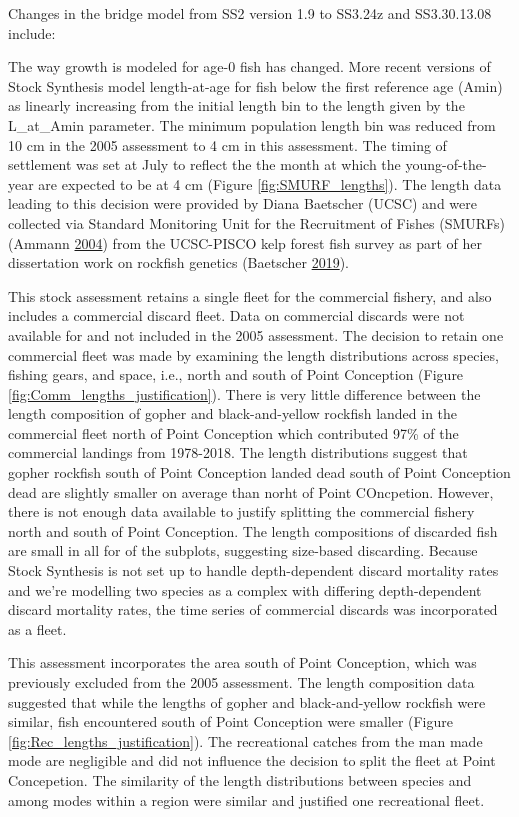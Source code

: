 \documentclass[12pt,]{article}
\begin{document}
Changes in the bridge model from SS2 version 1.9 to SS3.24z and
SS3.30.13.08 include:

The way growth is modeled for age-0 fish has changed. More recent
versions of Stock Synthesis model length-at-age for fish below the first
reference age (Amin) as linearly increasing from the initial length bin
to the length given by the L\_at\_Amin parameter. The minimum population
length bin was reduced from 10 cm in the 2005 assessment to 4 cm in this
assessment. The timing of settlement was set at July to reflect the the
month at which the young-of-the-year are expected to be at 4 cm (Figure
\ref{fig:SMURF_lengths}). The length data leading to this decision were
provided by Diana Baetscher (UCSC) and were collected via Standard
Monitoring Unit for the Recruitment of Fishes (SMURFs) (Ammann
\protect\hyperlink{ref-Ammann2004}{2004}) from the UCSC-PISCO kelp
forest fish survey as part of her dissertation work on rockfish genetics
(Baetscher \protect\hyperlink{ref-Baetscher2019}{2019}).

This stock assessment retains a single fleet for the commercial fishery,
and also includes a commercial discard fleet. Data on commercial
discards were not available for and not included in the 2005 assessment.
The decision to retain one commercial fleet was made by examining the
length distributions across species, fishing gears, and space, i.e.,
north and south of Point Conception (Figure
\ref{fig:Comm_lengths_justification}). There is very little difference
between the length composition of gopher and black-and-yellow rockfish
landed in the commercial fleet north of Point Conception which
contributed 97\% of the commercial landings from 1978-2018. The length
distributions suggest that gopher rockfish south of Point Conception
landed dead south of Point Conception dead are slightly smaller on
average than norht of Point COncpetion. However, there is not enough
data available to justify splitting the commercial fishery north and
south of Point Conception. The length compositions of discarded fish are
small in all for of the subplots, suggesting size-based discarding.
Because Stock Synthesis is not set up to handle depth-dependent discard
mortality rates and we're modelling two species as a complex with
differing depth-dependent discard mortality rates, the time series of
commercial discards was incorporated as a fleet.

This assessment incorporates the area south of Point Conception, which
was previously excluded from the 2005 assessment. The length composition
data suggested that while the lengths of gopher and black-and-yellow
rockfish were similar, fish encountered south of Point Conception were
smaller (Figure \ref{fig:Rec_lengths_justification}). The recreational
catches from the man made mode are negligible and did not influence the
decision to split the fleet at Point Concepetion. The similarity of the
length distributions between species and among modes within a region
were similar and justified one recreational fleet.
\end{document}
